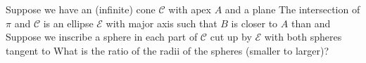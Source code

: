 Suppose we have an (infinite) cone $ \mathcal C$ with apex $ A$ and a plane  The intersection of $ \pi$ and $ \mathcal C$ is an ellipse $ \mathcal E$ with major axis  such that $ B$ is closer to $ A$ than  and    Suppose we inscribe a sphere in each part of $ \mathcal C$ cut up by $ \mathcal E$ with both spheres tangent to  What is the ratio of the radii of the spheres (smaller to larger)?